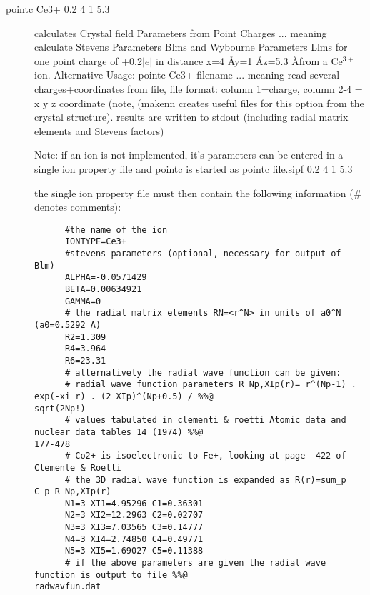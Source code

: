 \begin{description}
\item [\prg pointc Ce3+ 0.2 4 1 5.3]
              calculates Crystal field Parameters from Point Charges  
                 ... meaning calculate Stevens Parameters Blms 
                                  and Wybourne Parameters Llms
                 for one point charge of +0.2$|e|$ in distance
                 x=4 \AA y=1 \AA z=5.3 \AA from a Ce$^{3+}$ ion.
                Alternative Usage: pointc Ce3+ filename
                 ... meaning read several charges+coordinates from file,
                 file format: column 1=charge, column 2-4 = x y z coordinate  (note,
				 ({\prg makenn} creates useful files for this option from the crystal %
structure).
                results are written to stdout (including radial matrix elements and Stevens %
factors)

                Note: if an ion is not implemented, it's parameters can be 
                      entered in a single ion property file and pointc is
                      started as 
                        pointc file.sipf 0.2 4 1 5.3

                      the single ion property file must then contain the following
                      information (\# denotes comments):
\begin{verbatim}
      #the name of the ion
      IONTYPE=Ce3+
      #stevens parameters (optional, necessary for output of Blm)
      ALPHA=-0.0571429
      BETA=0.00634921
      GAMMA=0
      # the radial matrix elements RN=<r^N> in units of a0^N (a0=0.5292 A)
      R2=1.309
      R4=3.964
      R6=23.31
      # alternatively the radial wave function can be given:
      # radial wave function parameters R_Np,XIp(r)= r^(Np-1) . exp(-xi r) . (2 XIp)^(Np+0.5) / %%@
sqrt(2Np!)  
      # values tabulated in clementi & roetti Atomic data and nuclear data tables 14 (1974) %%@
177-478
      # Co2+ is isoelectronic to Fe+, looking at page  422 of Clemente & Roetti 
      # the 3D radial wave function is expanded as R(r)=sum_p C_p R_Np,XIp(r)
      N1=3 XI1=4.95296 C1=0.36301 
      N2=3 XI2=12.2963 C2=0.02707 
      N3=3 XI3=7.03565 C3=0.14777
      N4=3 XI4=2.74850 C4=0.49771 
      N5=3 XI5=1.69027 C5=0.11388
      # if the above parameters are given the radial wave function is output to file %%@
radwavfun.dat                 
\end{verbatim}                      


\end{description}
